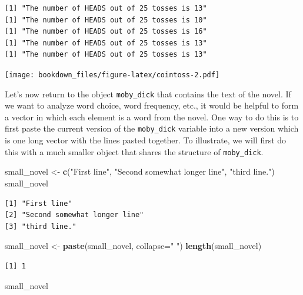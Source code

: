\documentclass[
]{krantz}
\makeatletter
\newenvironment{Shaded}{\begin{snugshade}}{\end{snugshade}}
\newcommand{\DataTypeTok}[1]{\textcolor[rgb]{0.27,0.27,0.27}{#1}}
\newcommand{\KeywordTok}[1]{\textcolor[rgb]{0.27,0.27,0.27}{\textbf{#1}}}
\newcommand{\NormalTok}[1]{#1}
\newcommand{\StringTok}[1]{\textcolor[rgb]{0.5,0.5,0.5}{#1}}
\newenvironment{kframe}{%
\medskip{}
\setlength{\fboxsep}{.8em}
 \def\at@end@of@kframe{}%
 \ifinner\ifhmode%
  \def\at@end@of@kframe{\end{minipage}}%
  \begin{minipage}{\columnwidth}%
 \fi\fi%
 \def\FrameCommand##1{\hskip\@totalleftmargin \hskip-\fboxsep
 \colorbox{shadecolor}{##1}\hskip-\fboxsep
     \hskip-\linewidth \hskip-\@totalleftmargin \hskip\columnwidth}%
 \MakeFramed {\advance\hsize-\width
   \@totalleftmargin\z@ \linewidth\hsize
   \@setminipage}}%
 {\par\unskip\endMakeFramed%
 \at@end@of@kframe}
\renewenvironment{Shaded}{\begin{kframe}}{\end{kframe}}
\makeatother
\begin{document}
\begin{verbatim}
[1] "The number of HEADS out of 25 tosses is 13"
[1] "The number of HEADS out of 25 tosses is 10"
[1] "The number of HEADS out of 25 tosses is 16"
[1] "The number of HEADS out of 25 tosses is 13"
[1] "The number of HEADS out of 25 tosses is 13"
\end{verbatim}

\texttt{[image: bookdown\_files/figure-latex/cointoss-2.pdf]}

Let's now return to the object \texttt{moby\_dick} that contains the text of the novel. If we want to analyze word choice, word frequency, etc., it would be helpful to form a vector in which each element is a word from the novel. One way to do this is to first paste the current version of the \texttt{moby\_dick} variable into a new version which is one long vector with the lines pasted together. To illustrate, we will first do this with a much smaller object that shares the structure of \texttt{moby\_dick}.

\begin{Shaded}
\begin{Highlighting}[]
\NormalTok{small\_novel \textless{}{-}}\StringTok{ }\KeywordTok{c}\NormalTok{(}\StringTok{"First line"}\NormalTok{, }\StringTok{"Second somewhat longer line"}\NormalTok{, }
                 \StringTok{"third line."}\NormalTok{)}
\NormalTok{small\_novel}
\end{Highlighting}
\end{Shaded}

\begin{verbatim}
[1] "First line"                 
[2] "Second somewhat longer line"
[3] "third line."                
\end{verbatim}

\begin{Shaded}
\begin{Highlighting}[]
\NormalTok{small\_novel \textless{}{-}}\StringTok{ }\KeywordTok{paste}\NormalTok{(small\_novel, }\DataTypeTok{collapse=}\StringTok{" "}\NormalTok{)}
\KeywordTok{length}\NormalTok{(small\_novel)}
\end{Highlighting}
\end{Shaded}

\begin{verbatim}
[1] 1
\end{verbatim}

\begin{Shaded}
\begin{Highlighting}[]
\NormalTok{small\_novel}
\end{Highlighting}
\end{Shaded}
\end{document}
